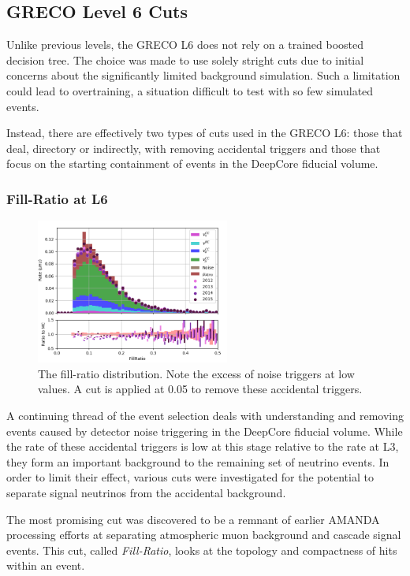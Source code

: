 \graphicspath{{chapters/greco/images/level6/}}

\subsection{GRECO Level 6 Cuts}
Unlike previous levels, the GRECO L6 does not rely on a trained boosted decision tree.
The choice was made to use solely stright cuts due to initial concerns about the significantly limited background simulation.
Such a limitation could lead to overtraining, a situation difficult to test with so few simulated events.

Instead, there are effectively two types of cuts used in the GRECO L6:
those that deal, directory or indirectly, with removing accidental triggers and those that focus on the starting containment of events in the DeepCore fiducial volume.

\subsubsection{Fill-Ratio at L6}
\begin{figure}[h]
	\centering
		\includegraphics[width=2.5in]{FillRatio.png}
		\caption[Fill-Ratio]{The fill-ratio distribution. Note the excess of noise triggers at low values. A cut is applied at 0.05 to remove these accidental triggers.}
	\label{fig:fill-ratio}
\end{figure}

A continuing thread of the event selection deals with understanding and removing events caused by detector noise triggering in the DeepCore fiducial volume.
While the rate of these accidental triggers is low at this stage relative to the rate at L3, they form an important background to the remaining set of neutrino events.
In order to limit their effect, various cuts were investigated for the potential to separate signal neutrinos from the accidental background.

The most promising cut was discovered to be a remnant of earlier AMANDA processing efforts at separating atmospheric muon background and cascade signal events.
This cut, called \emph{Fill-Ratio}, looks at the topology and compactness of hits within an event.

